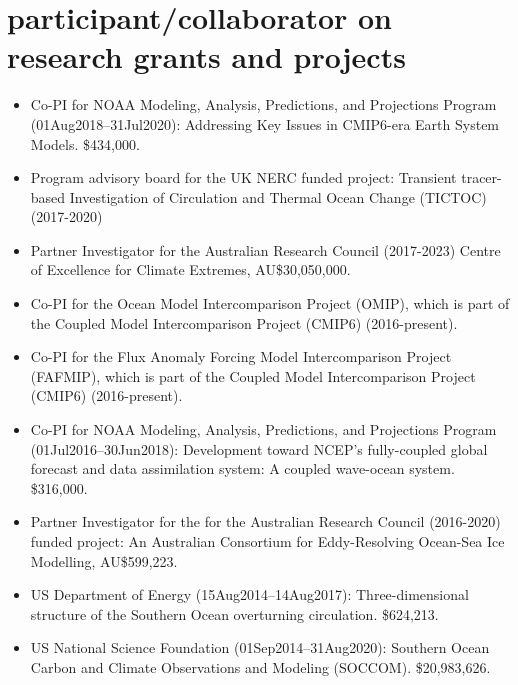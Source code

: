 \documentclass{article}
\begin{document}
\section*{\sc \color{Maroon}  participant/collaborator on research grants and projects}
\vspace{-.3cm}

\begin{itemize}[leftmargin=*]

\item Co-PI for NOAA Modeling, Analysis, Predictions, and Projections Program (01Aug2018--31Jul2020): Addressing Key Issues in CMIP6-era Earth System Models. \$434,000.
    
\item Program advisory board for the UK NERC funded project: Transient tracer-based Investigation of Circulation and Thermal Ocean Change (TICTOC) (2017-2020)

\item Partner Investigator for the Australian Research Council (2017-2023) Centre of Excellence for Climate Extremes, AU\$30,050,000.
  
\item Co-PI for the Ocean Model Intercomparison Project (OMIP), which is part of the Coupled Model Intercomparison Project (CMIP6) (2016-present).    
\item Co-PI for the Flux Anomaly Forcing Model Intercomparison Project (FAFMIP), which is part of the Coupled Model Intercomparison Project (CMIP6) (2016-present).    

\item Co-PI for NOAA Modeling, Analysis, Predictions, and Projections Program (01Jul2016--30Jun2018): Development toward NCEP's fully-coupled
  global forecast and data assimilation system: A coupled wave-ocean
  system.  \$316,000.

\item Partner Investigator for the for the Australian Research Council (2016-2020) funded project: An Australian Consortium for Eddy-Resolving Ocean-Sea Ice Modelling, AU\$599,223.

\item US Department of Energy (15Aug2014--14Aug2017):
  Three-dimensional structure of the Southern Ocean overturning
  circulation.  \$624,213.

\item US National Science Foundation (01Sep2014--31Aug2020): Southern
  Ocean Carbon and Climate Observations and Modeling
  (SOCCOM). \$20,983,626.


\end{itemize}
\end{document}
